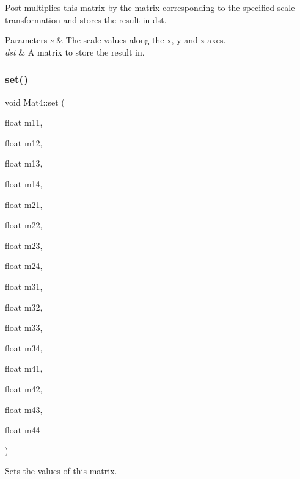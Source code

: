 Post-\/multiplies this matrix by the matrix corresponding to the specified scale transformation and stores the result in dst.


\begin{DoxyParams}{Parameters}
{\em s} & The scale values along the x, y and z axes. \\
\hline
{\em dst} & A matrix to store the result in. \\
\hline
\end{DoxyParams}
\mbox{\label{classMat4_ac89d4d819ec41144c653dd80e4ddb6c3}} 
\subsubsection{\texorpdfstring{set()}{set()}\hspace{0.1cm}{\footnotesize\ttfamily [1/6]}}
{\footnotesize\ttfamily void Mat4\+::set (\begin{DoxyParamCaption}\item[{float}]{m11,  }\item[{float}]{m12,  }\item[{float}]{m13,  }\item[{float}]{m14,  }\item[{float}]{m21,  }\item[{float}]{m22,  }\item[{float}]{m23,  }\item[{float}]{m24,  }\item[{float}]{m31,  }\item[{float}]{m32,  }\item[{float}]{m33,  }\item[{float}]{m34,  }\item[{float}]{m41,  }\item[{float}]{m42,  }\item[{float}]{m43,  }\item[{float}]{m44 }\end{DoxyParamCaption})}

Sets the values of this matrix.


